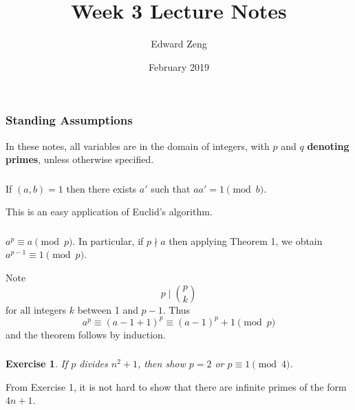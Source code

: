 \documentclass{article}
\title{Week 3 Lecture Notes}
\author{Edward Zeng}
\date{February 2019}
\newtheorem{exercise}{Exercise}
\begin{document}
\maketitle

\subsubsection{Standing Assumptions}
In these notes, all variables are in the domain of integers, with $p$ and $q$ \textbf{denoting primes}, unless otherwise specified.

\subsubsection{}
\begin{thm}
    If $(a,b) = 1$ then there exists $a'$ such that $aa' = 1 \pmod{b}$.
\end{thm}
This is an easy application of Euclid's algorithm.
\subsubsection{}
\begin{thm}[Fermat]
    $a^{p} \equiv a \pmod{p}$. In particular, if $p\nmid a$ then applying Theorem 1, we obtain $a^{p-1} \equiv 1 \pmod{p}$.
\end{thm}
Note
\begin{equation}
    p \mid {\binom{p}{k}}
\end{equation}
for all integers $k$ between 1 and $p-1$. Thus
\begin{equation}
    a^{p} \equiv (a-1 + 1)^{p}
          \equiv (a-1)^{p} + 1 \pmod{p}
\end{equation}
and the theorem follows by induction.

\subsubsection{}
\begin{exercise}
    If $p$ divides $n^{2}+1$, then show $p = 2$ or $p \equiv 1 \pmod{4}$.
\end{exercise}
From Exercise 1, it is not hard to show that there are infinite primes of the form $4n+1$.
\end{document}
